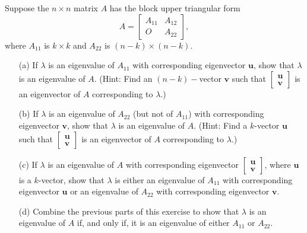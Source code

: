 \begin{pro}
  Suppose the $n\times n$ matrix $A$ has the block upper triangular form
  \begin{displaymath}
    A =
    \begin{bmatrix}
      A_{11} & A_{12} \\
      O & A_{22}
    \end{bmatrix},
  \end{displaymath}
  where $A_{11}$ is $k\times k$ and
  $A_{22}$ is $(n-k)\times(n-k)$.
  \begin{itemize}
  \item[(a)]
    If $\lambda$ is an eigenvalue of $A_{11}$ with corresponding
    eigenvector $\mathbf{u}$,
    show that $\lambda$ is an eigenvalue of $A$.
    (Hint: Find an $(n-k)-$vector $\mathbf{v}$ such that
    $
    \begin{bmatrix}
      \mathbf{u} \\ \mathbf{v}
    \end{bmatrix}
    $ is an eigenvector of $A$ corresponding to $\lambda$.)

  \item[(b)]
    If $\lambda$ is an eigenvalue of $A_{22}$ (but not of $A_{11}$)
    with corresponding eigenvector $\mathbf{v}$,
    show that $\lambda$ is an eigenvalue of $A$.
    (Hint: Find a $k$-vector $\mathbf{u}$ such that
    $
    \begin{bmatrix}
      \mathbf{u} \\
      \mathbf{v}
    \end{bmatrix}
    $ is an eigenvector of $A$ corresponding to $\lambda$.)

  \item[(c)]
    If $\lambda$ is an eigenvalue of $A$ with corresponding eigenvector
    $
    \begin{bmatrix}
      \mathbf{u} \\ \mathbf{v}
    \end{bmatrix}
    $, where $\mathbf{u}$ is a $k$-vector,
    show that $\lambda$ is either an eigenvalue of $A_{11}$ with
    corresponding eigenvector $\mathbf{u}$ or an eigenvalue of $A_{22}$ with
    corresponding eigenvector $\mathbf{v}$.

  \item[(d)]
    Combine the previous parts of this exercise to show that
    $\lambda$ is an eigenvalue of $A$ if, and only if,
    it is an eigenvalue of either $A_{11}$ or $A_{22}$.
  \end{itemize}
\end{pro}

